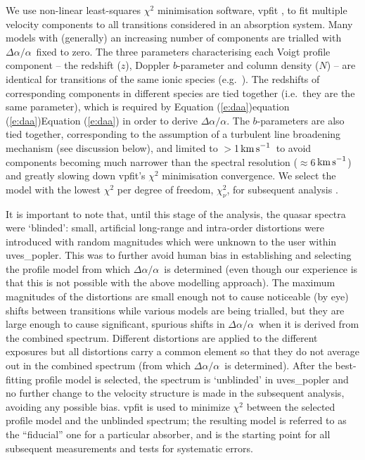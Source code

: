 \documentclass[fleqn,usenatbib,usedcolumn]{mnras}
\newcommand{\Eref}[1]{\ifhmode \ifnum\spacefactor=1001 Equation (\ref{#1})\else equation (\ref{#1})\fi \else Equation (\ref{#1})\fi}
\newcommand{\kms}{\ensuremath{\textrm{km\,s}^{-1}}}
\newcommand{\daa}{\ensuremath{\Delta\alpha/\alpha}}
\begin{document}
We use non-linear least-squares $\chi^2$ minimisation software, {\sc vpfit} \citep[version 9.5;][]{Carswell:2014:VPFIT}, to fit multiple velocity components to all transitions considered in an absorption system. Many models with (generally) an increasing number of components are trialled with \daa\ fixed to zero. The three parameters characterising each Voigt profile component -- the redshift ($z$), Doppler $b$-parameter and column density ($N$) -- are identical for transitions of the same ionic species (e.g.\ ). The redshifts of corresponding components in different species are tied together (i.e.\ they are the same parameter), which is required by \Eref{e:daa} in order to derive \daa. The $b$-parameters are also tied together, corresponding to the assumption of a turbulent line broadening mechanism (see discussion below), and limited to $>$1\,\kms\ to avoid components becoming much narrower than the spectral resolution ($\approx$6\,\kms) and greatly slowing down {\sc vpfit}'s $\chi^2$ minimisation convergence. We select the model with the lowest $\chi^2$ per degree of freedom, $\chi^2_\nu$, for subsequent analysis \citep{Murphy:2008:1053}.

It is important to note that, until this stage of the analysis, the quasar spectra were `blinded': small, artificial long-range and intra-order distortions were introduced with random magnitudes which were unknown to the user within {\sc uves\_popler}. This was to further avoid human bias in establishing and selecting the profile model from which \daa\ is determined (even though our experience is that this is not possible with the above modelling approach). The maximum magnitudes of the distortions are small enough not to cause noticeable (by eye) shifts between transitions while various models are being trialled, but they are large enough to cause significant, spurious shifts in \daa\ when it is derived from the combined spectrum. Different distortions are applied to the different exposures but all distortions carry a common element so that they do not average out in the combined spectrum (from which \daa\ is determined). After the best-fitting profile model is selected, the spectrum is `unblinded' in {\sc uves\_popler} and no further change to the velocity structure is made in the subsequent analysis, avoiding any possible bias. {\sc vpfit} is used to minimize $\chi^2$ between the selected profile model and the unblinded spectrum; the resulting model is referred to as the ``fiducial'' one for a particular absorber, and is the starting point for all subsequent measurements and tests for systematic errors.
\end{document}
